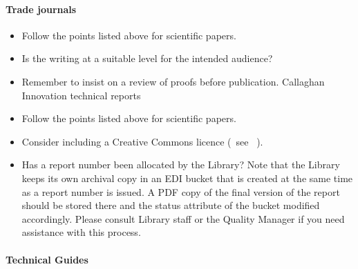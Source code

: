 \paragraph{Trade journals}
\begin{itemize}
\item  Follow the points listed above for scientific papers.
\item  Is the writing at a suitable level for the intended audience?
\item  Remember to insist on a review of proofs before publication.
 Callaghan Innovation technical reports
\item  Follow the points listed above for scientific papers.
\item  Consider including a Creative Commons licence (~see \cite{MSL_Reporting_Guidelines}~).
\item  Has a report number been allocated by the Library? Note that the Library keeps its own archival copy in an EDI bucket that is created at the same time as a report number is issued. A PDF copy of the final version of the report should be stored there and the status attribute of the bucket modified accordingly. Please consult Library staff or the Quality Manager if you need assistance with this process.
\end{itemize} 

\paragraph{Technical Guides}

